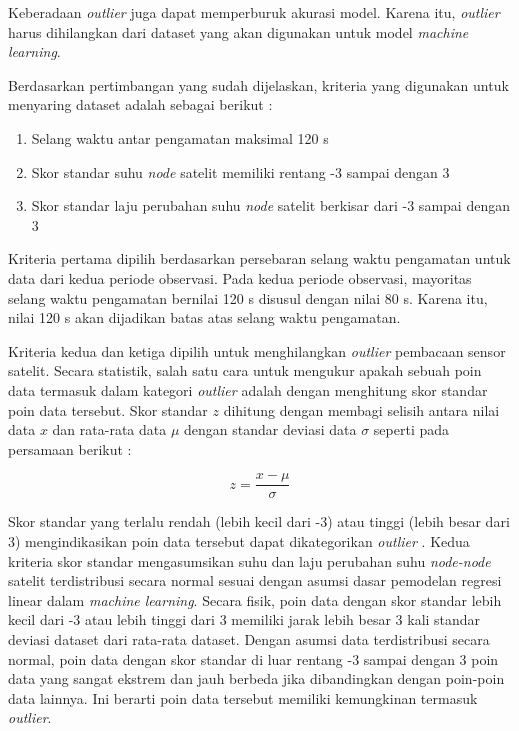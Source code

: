 Keberadaan \textit{outlier} juga dapat memperburuk akurasi model. Karena itu, \textit{outlier} harus dihilangkan dari dataset yang akan digunakan untuk model \textit{machine learning}.

Berdasarkan pertimbangan yang sudah dijelaskan, kriteria yang digunakan untuk
menyaring dataset adalah sebagai berikut :

\begin{enumerate}
\item Selang waktu antar pengamatan maksimal 120 s 
\item Skor standar suhu \textit{node} satelit memiliki rentang -3 sampai dengan 3
\item Skor standar laju perubahan suhu \textit{node} satelit berkisar dari -3 sampai dengan 3 
\end{enumerate}

Kriteria pertama dipilih berdasarkan persebaran selang waktu pengamatan untuk
data dari kedua periode observasi. Pada kedua periode observasi, mayoritas selang waktu pengamatan bernilai 120 s disusul dengan nilai 80 s. Karena itu, nilai 120 s akan dijadikan batas atas selang waktu pengamatan.

Kriteria kedua dan ketiga dipilih untuk menghilangkan \textit{outlier}
pembacaan sensor satelit. Secara statistik, salah satu cara untuk mengukur
apakah sebuah poin data termasuk dalam kategori \textit{outlier} adalah dengan
menghitung skor standar poin data tersebut. Skor standar $z$ dihitung dengan
membagi selisih antara nilai data $x$ dan rata-rata data $\mu$ dengan standar
deviasi data $\sigma$ seperti pada persamaan berikut \cite{massaron}:

\begin{equation}
\label{eq:zscore}
	z = \frac{x - \mu}{\sigma}
\end{equation}

Skor standar yang terlalu rendah (lebih kecil dari -3) atau tinggi (lebih besar
dari 3) mengindikasikan poin data tersebut dapat dikategorikan \textit{outlier}
\cite{boschetti2015}. Kedua kriteria skor standar mengasumsikan suhu dan laju
perubahan suhu \textit{node-node} satelit terdistribusi secara normal sesuai
dengan asumsi dasar pemodelan regresi linear dalam \textit{machine learning}.
Secara fisik, poin data dengan skor standar lebih kecil dari -3 atau lebih
tinggi dari 3 memiliki jarak lebih besar 3 kali standar deviasi dataset dari
rata-rata dataset. Dengan asumsi data terdistribusi secara normal, poin data
dengan skor standar di luar rentang -3 sampai dengan 3 poin data yang sangat
ekstrem dan jauh berbeda jika dibandingkan dengan poin-poin data lainnya. Ini
berarti poin data tersebut memiliki kemungkinan termasuk \textit{outlier}. 

